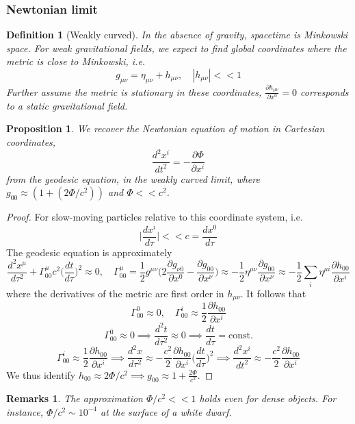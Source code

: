 \documentclass[a4paper]{article}
\newtheorem{remarks}{Remarks}[section]
\theoremstyle{new}
\newtheorem{defi}{Definition}[section]
\newtheorem{prop}{Proposition}[section]
\begin{document}
\subsubsection{Newtonian limit}
\begin{defi}[Weakly curved]
In the absence of gravity, spacetime is Minkowski space. For weak gravitational fields, we expect to find global coordinates where the metric is close to Minkowski, i.e.
$$g_{\mu\nu}=\eta_{\mu\nu}+h_{\mu\nu},\quad|h_{\mu\nu}|<<1$$
Further assume the metric is stationary in these coordinates, $\frac{\partial h_{\mu\nu}}{\partial x^0}=0$ corresponds to a static gravitational field.
\end{defi}
\begin{prop}
We recover the Newtonian equation of motion in Cartesian coordinates, 
$$\frac{d^2x^i}{dt^2}=-\frac{\partial\Phi}{\partial x^i}$$
from the geodesic equation, in the weakly curved limit, where $g_{00}\approx(1+(2\Phi/c^2))$ and $\Phi<<c^2$.
\end{prop}
\begin{proof}
For slow-moving particles relative to this coordinate system, i.e. 
$$\bigg|\frac{dx^i}{d\tau}\bigg|<<c=\frac{dx^0}{d\tau}$$
The geodesic equation is approximately
$$\frac{d^2x^\mu}{d\tau^2}+\Gamma^\mu_{00}c^2\bigg(\frac{dt}{d\tau}\bigg)^2\approx 0,\quad\Gamma^\mu_{00}=\frac{1}{2}g^{\mu\nu}\bigg(2\frac{\partial g_{\nu0}}{\partial x^0}-\frac{\partial g_{00}}{\partial x^\nu}\bigg)\approx-\frac{1}{2}\eta^{\mu\nu}\frac{\partial g_{00}}{\partial x^\nu}\approx-\frac{1}{2}\sum_i\eta^{\mu i}\frac{\partial h_{00}}{\partial x^i}$$
where the derivatives of the metric are first order in $h_{\mu\nu}$. It follows that
\begin{equation}
    \Gamma^0_{00}\approx0,\quad\Gamma^i_{00}\approx\frac{1}{2}\frac{\partial h_{00}}{\partial x^i}\label{connectionNewtonian}
\end{equation}
$$\Gamma^0_{00}\approx 0\implies\frac{d^2t}{d\tau^2}\approx0\implies\frac{dt}{d\tau}=\text{const.}$$
$$\Gamma^i_{00}\approx \frac{1}{2}\frac{\partial h_{00}}{\partial x^i}\implies\frac{d^2x}{d\tau^2}\approx-\frac{c^2}{2}\frac{\partial h_{00}}{\partial x^i}\bigg(\frac{dt}{d\tau}\bigg)^2\implies\frac{d^2x^i}{dt^2}\approx-\frac{c^2}{2}\frac{\partial h_{00}}{\partial x^i}$$
We thus identify $h_{00}\approx2\Phi/c^2\implies g_{00}\approx1+\frac{2\Phi}{c^2}$.
\end{proof}
\begin{remarks}
The approximation $\Phi/c^2<<1$ holds even for dense objects. For instance, $\Phi/c^2\sim 10^{-4}$ at the surface of a white dwarf.
\end{remarks}
\newpage
\end{document}
